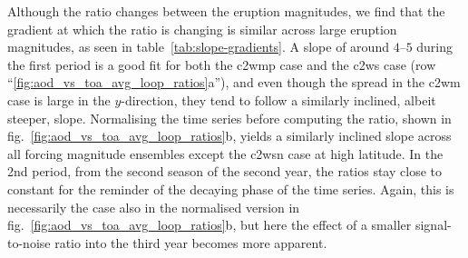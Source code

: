 \documentclass{ametsocV6.1}
\begin{document}
Although the ratio changes between the eruption magnitudes, we find that the gradient at
which the ratio is changing is similar across large eruption magnitudes, as seen in
table~\ref{tab:slope-gradients}. A slope of around \(4\)--\(5\) during the first period
is a good fit for both the \gls{c2wmp} case and the \gls{c2ws} case (row
``\ref{fig:aod_vs_toa_avg_loop_ratios}a''), and even though the spread in the \gls{c2wm}
case is large in the \(y\)-direction, they tend to follow a similarly inclined, albeit
steeper, slope. Normalising the time series before computing the ratio, shown in
fig.~\ref{fig:aod_vs_toa_avg_loop_ratios}b, yields a similarly inclined slope across all
forcing magnitude ensembles except the \gls{c2wsn} case at high latitude. In the 2nd
period, from the second season of the second year, the ratios stay close to constant for
the reminder of the decaying phase of the time series. Again, this is necessarily the
case also in the normalised version in fig.~\ref{fig:aod_vs_toa_avg_loop_ratios}b, but
here the effect of a smaller signal-to-noise ratio into the third year becomes more
apparent.
\end{document}
